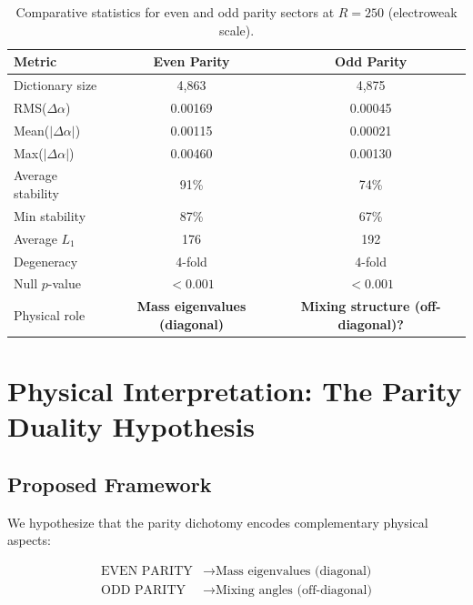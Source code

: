 \documentclass[11pt,a4paper]{article}
\begin{document}
\begin{table}[h]
\centering
\caption{Comparative statistics for even and odd parity sectors at $R=250$ (electroweak scale).}
\label{tab:compare}
\begin{tabular}{lcc}
\toprule
\textbf{Metric} & \textbf{Even Parity} & \textbf{Odd Parity} \\
\midrule
Dictionary size & 4,863 & 4,875 \\
RMS($\Delta\alpha$) & 0.00169 & 0.00045 \\
Mean($|\Delta\alpha|$) & 0.00115 & 0.00021 \\
Max($|\Delta\alpha|$) & 0.00460 & 0.00130 \\
Average stability & 91\% & 74\% \\
Min stability & 87\% & 67\% \\
Average $L_1$ & 176 & 192 \\
Degeneracy & 4-fold & 4-fold \\
Null $p$-value & $<0.001$ & $<0.001$ \\
\midrule
Physical role & \textbf{Mass eigenvalues (diagonal)} & \textbf{Mixing structure (off-diagonal)?} \\
\bottomrule
\end{tabular}
\end{table}

\section{Physical Interpretation: The Parity Duality Hypothesis}

\subsection{Proposed Framework}

We hypothesize that the parity dichotomy encodes complementary physical aspects:

\begin{equation}
\boxed{
\begin{aligned}
\text{EVEN PARITY} &\longrightarrow \text{Mass eigenvalues (diagonal)} \\
\text{ODD PARITY} &\longrightarrow \text{Mixing angles (off-diagonal)}
\end{aligned}
}
\end{equation}
\end{document}
